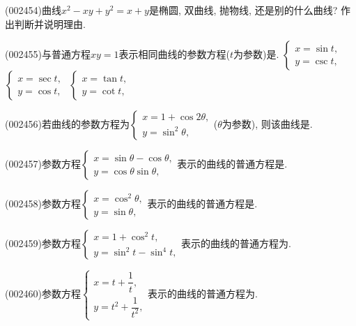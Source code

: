 \item (002454)曲线$x^2-xy+y^2=x+y$是椭圆, 双曲线, 抛物线, 还是别的什么曲线? 作出判断并说明理由.
\item (002455)与普通方程$xy=1$表示相同曲线的参数方程($t$为参数)是.
{$\left\{\begin{array}{l}x=\sin t,\\y=\csc t,\end{array}\right.$}
{$\left\{\begin{array}{l}x=\sec t,\\y=\cos t,\end{array}\right.$}
{$\left\{\begin{array}{l}x=\tan t,\\y=\cot t,\end{array}\right.$}
\item (002456)若曲线的参数方程为$\left\{\begin{array}{l}x=1+\cos 2\theta,\\y=\sin^2\theta,\end{array}\right.$($\theta$为参数), 则该曲线是.
\item (002457)参数方程$\left\{\begin{array}{l}x=\sin \theta-\cos\theta,\\y=\cos\theta\sin\theta,\end{array}\right.$表示的曲线的普通方程是.
\item (002458)参数方程$\left\{\begin{array}{l}x=\cos^2\theta,\\y=\sin\theta,\end{array}\right.$表示的曲线的普通方程是.
\item (002459)参数方程$\left\{\begin{array}{l}x=1+\cos^2t,\\y=\sin^2t-\sin^4t,\end{array}\right.$表示的曲线的普通方程为.
\item (002460)参数方程$\left\{\begin{array}{l}x=t+\dfrac{1}{t},\\y=t^2+\dfrac{1}{t^2},\end{array}\right.$表示的曲线的普通方程为.
